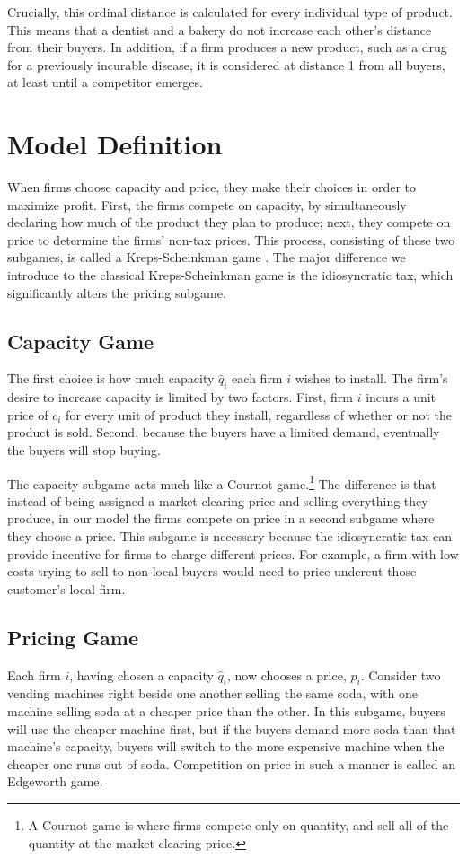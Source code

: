 \documentclass[11pt]{article}
\begin{document}
Crucially, this ordinal distance is calculated for every individual type of
product. This means that a dentist and a bakery do not increase each other's
distance from their buyers. In addition, if a firm produces a new product, such
as a drug for a previously incurable disease, it is considered at distance 1
from all buyers, at least until a competitor emerges.

\section{Model Definition}
When firms choose capacity and price, they make their choices in order to
maximize profit. First, the firms compete on capacity, by simultaneously
declaring how much of the product they plan to produce; next, they compete on
price to determine the firms' non-tax prices. This process, consisting of these
two subgames, is called a Kreps-Scheinkman game \cite{kreps1983quantity}.
The major difference we introduce to the classical Kreps-Scheinkman game is the
idiosyncratic tax, which significantly alters the pricing subgame.

\subsection{Capacity Game}
The first choice is how much capacity $\hat q_i$ each firm $i$ wishes to
install. The firm's desire to increase capacity is limited by two factors.
First, firm $i$ incurs a unit price of $c_i$ for every unit of product they
install, regardless of whether or not the product is sold. Second, because the
buyers have a limited demand, eventually the buyers will stop buying.

The capacity subgame acts much like a Cournot game.\footnote{A Cournot game is
where firms compete only on quantity, and sell all of the quantity at the
market clearing price.} The difference is that instead of being assigned a
market clearing price and selling everything they produce, in our model the
firms compete on price in a second subgame where they choose a price. This
subgame is necessary because the idiosyncratic tax can provide incentive for
firms to charge different prices. For example, a firm with low costs trying to
sell to non-local buyers would need to price undercut those customer's local
firm.

\subsection{Pricing Game}
Each firm $i$, having chosen a capacity $\hat q_i$, now chooses a price, $p_i$.
Consider two vending machines right beside one another selling the same soda,
with one machine selling soda at a cheaper price than the other. In this
subgame, buyers will use the cheaper machine first, but if the buyers demand
more soda than that machine's capacity, buyers will switch to the more
expensive machine when the cheaper one runs out of soda. Competition on price
in such a manner is called an Edgeworth game.
\end{document}
